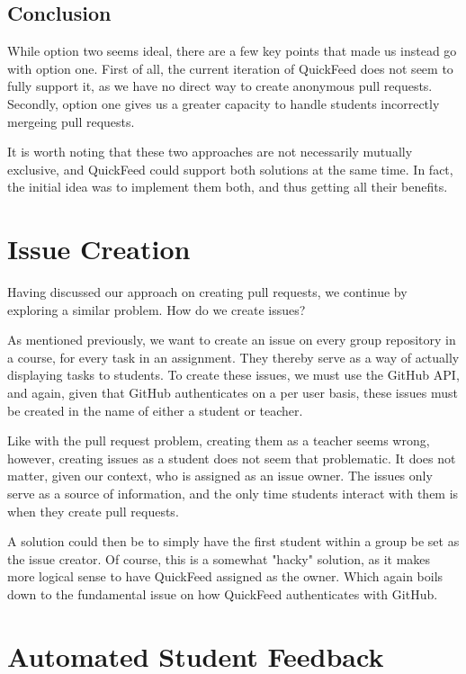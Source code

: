 \subsection{Conclusion}

While option two seems ideal, there are a few key points that made us instead go with option one.
First of all, the current iteration of QuickFeed does not seem to fully support it, as we have no direct way to create anonymous pull requests.
Secondly, option one gives us a greater capacity to handle students incorrectly mergeing pull requests.

It is worth noting that these two approaches are not necessarily mutually exclusive, and QuickFeed could support both solutions at the same time.
In fact, the initial idea was to implement them both, and thus getting all their benefits.

\section{Issue Creation}
\label{sec:issue-creation}

Having discussed our approach on creating pull requests, we continue by exploring a similar problem.
How do we create issues?

As mentioned previously, we want to create an issue on every group repository in a course, for every task in an assignment.
They thereby serve as a way of actually displaying tasks to students.
To create these issues, we must use the GitHub API, and again, given that GitHub authenticates on a per user basis, these issues must be created in the name of either a student or teacher.

Like with the pull request problem, creating them as a teacher seems wrong, however, creating issues as a student does not seem that problematic.
It does not matter, given our context, who is assigned as an issue owner.
The issues only serve as a source of information, and the only time students interact with them is when they create pull requests.

A solution could then be to simply have the first student within a group be set as the issue creator.
Of course, this is a somewhat "hacky" solution, as it makes more logical sense to have QuickFeed assigned as the owner.
Which again boils down to the fundamental issue on how QuickFeed authenticates with GitHub.

\section{Automated Student Feedback}

